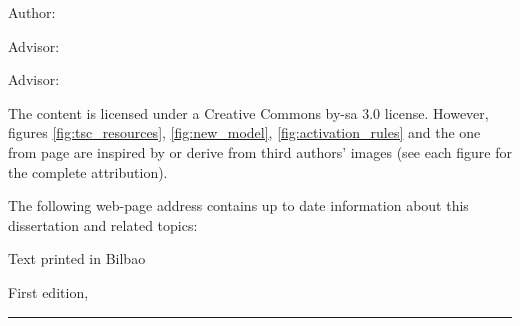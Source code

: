 
\thispagestyle{empty}

\hfill

\vfill

\medskip


\noindent
\textit{
\Title
}




Author: \Author

Advisor: \Advisor

Advisor: \Advisortwo


\vfill


\noindent
The content is licensed under a Creative Commons by-sa 3.0 license.
However, figures \ref{fig:tsc_resources}, \ref{fig:new_model}, \ref{fig:activation_rules} and the one from page \pageref{fig:shouldersOfGiants} are inspired by or derive from third authors' images
(see each figure for the complete attribution).

\vfill

\noindent
The following web-page address contains up to date information about this dissertation and related topics: \\
\website


\noindent
Text printed in Bilbao

\noindent
First edition, 
\monthname \ \the\year

\vspace{1cm}
\hrule
\bigskip

\cleardoublepage

%
%
%
%
%
%

